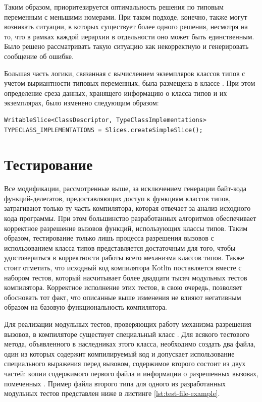 Таким образом, приоритезируется оптимальность решения по типовым переменным с меньшими номерами. При таком подходе, конечно, также могут возникать ситуации, в которых существует более одного решения, несмотря на то, что в рамках каждой иерархии в отдельности оно может быть единственным. Было решено рассматривать такую ситуацию как некорректную и генерировать сообщение об ошибке. 

Большая часть логики, связанная с вычислением экземпляров классов типов с учетом выриантности типовых переменных, была размещена в классе . При этом определение среза данных, хранящего информацию о класса типов и их экземплярах, было изменено следующим образом:
\begin{lstlisting}[style={wo_caption}]
WritableSlice<ClassDescriptor, TypeClassImplementations> 
TYPECLASS_IMPLEMENTATIONS = Slices.createSimpleSlice();
\end{lstlisting}

\section{Тестирование}

Все модификации, рассмотренные выше, за исключением генерации байт-кода функций-делегатов, предоставляющих доступ к функциям классов типов, затрагивают только ту часть компилятора, которая отвечает за анализ исходного кода программы. При этом большинство разработанных алгоритмов обеспечивает корректное разрешение вызовов функций, использующих классы типов. Таким образом, тестирование только лишь процесса разрешения вызовов с использованием класса типов представляется достаточным для того, чтобы удостовериться в корректности работы всего механизма классов типов. Также стоит отметить, что исходный код компилятора Kotlin поставляется вместе с набором тестов, который насчитывает более двадцати тысяч модульных тестов компилятора. Корректное исполнение этих тестов, в свою очередь, позволяет обосновать тот факт, что описанные выше изменения не влияют негативным образом на базовую функциональность компилятора. 

Для реализации модульных тестов, проверяющих работу механизма разрешения вызовов, в компиляторе существует специальный класс . Для всякого тестового метода, объявленного в наследниках этого класса, необходимо создать два файла, один из которых содержит компилируемый код и допускает использование специального выражения  перед вызовом, содержимое второго состоит из двух частей: копии содержимого первого файла и информации о разрешенных вызовах, помеченных . Пример файла второго типа для одного из разработанных модульных тестов представлен ниже в листинге \ref{lst:test-file-example}.

